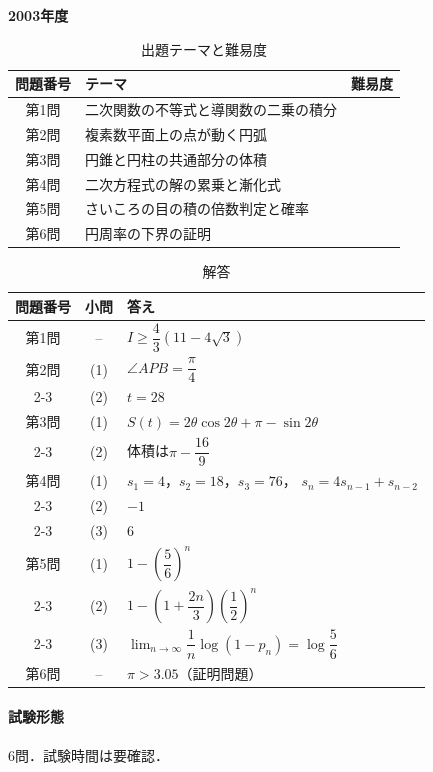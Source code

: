 \documentclass[../../main.tex]{subfiles}
\begin{document}
\begin{center}
  {\fontsize{48pt}{58pt}\selectfont \textbf{2003}\normalsize\textbf{年度}}
\end{center}

\begin{table}[htb]
  \centering
  \caption{出題テーマと難易度}
  \begin{tabular}{|c|p{9cm}|c|}
    \hline
    \textbf{問題番号} & \textbf{テーマ} & \textbf{難易度} \\
    \hline
    第1問 & 二次関数の不等式と導関数の二乗の積分 & \\
    \hline
    第2問 & 複素数平面上の点が動く円弧 & \\
    \hline
    第3問 & 円錐と円柱の共通部分の体積 & \\
    \hline
    第4問 & 二次方程式の解の累乗と漸化式 & \\
    \hline
    第5問 & さいころの目の積の倍数判定と確率 & \\
    \hline
    第6問 & 円周率の下界の証明 & \\
    \hline
  \end{tabular}
\end{table}

\begin{table}[htb]
  \centering
  \caption{解答}
  \renewcommand{\arraystretch}{1.4}
  \begin{tabular}{|c|c|p{9cm}|}
    \hline
    \textbf{問題番号} & \textbf{小問} & \textbf{答え} \\
    \hline
    第1問 & -- & $I\ge\dfrac{4}{3}(11-4\sqrt{3})$ \\
    \hline
    第2問 & (1) & $\angle APB=\dfrac{\pi}{4}$ \\
    \cline{2-3}
    & (2) & $t=28$ \\
    \hline
    第3問 & (1) & $S(t)=2\theta\cos2\theta+\pi-\sin2\theta$ \\
    \cline{2-3}
    & (2) & 体積は$\pi-\dfrac{16}{9}$ \\
    \hline
    第4問 & (1) & $s_1=4$，$s_2=18$，$s_3=76$，
    $s_n=4s_{n-1}+s_{n-2}$ \\
    \cline{2-3}
    & (2) & $-1$ \\
    \cline{2-3}
    & (3) & $6$ \\
    \hline
    第5問 & (1) & $1-\left(\dfrac{5}{6}\right)^n$ \\
    \cline{2-3}
    & (2) & $1-\left(1+\dfrac{2n}{3}\right)
    \left(\dfrac{1}{2}\right)^n$ \\
    \cline{2-3}
    & (3) & $\displaystyle\lim_{n\to\infty}
    \dfrac{1}{n}\log(1-p_n)=\log\dfrac{5}{6}$ \\
    \hline
    第6問 & -- & $\pi>3.05$（証明問題） \\
    \hline
  \end{tabular}
\end{table}

\paragraph{試験形態}
6問．試験時間は要確認．
\end{document}
